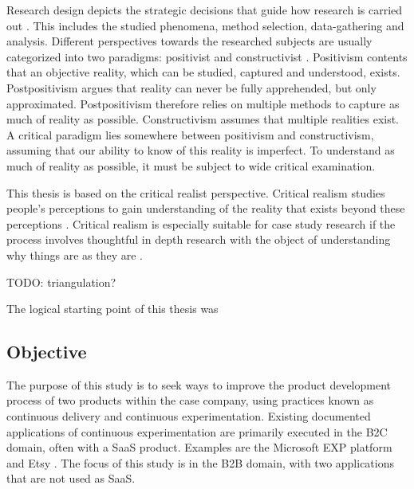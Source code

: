 \documentclass[english]{tktltiki2}
\theoremstyle{definition}
\theoremstyle{remark}
\begin{document}
Research design depicts the strategic decisions that guide how research is carried out \cite{denzin2000discipline}. This includes the studied phenomena, method selection, data-gathering and analysis. Different perspectives towards the researched subjects are usually categorized into two paradigms: positivist and constructivist \cite{gephart2004qualitative}. Positivism contents that an objective reality, which can be studied, captured and understood, exists. Postpositivism argues that reality can never be fully apprehended, but only approximated. Postpositivism therefore relies on multiple methods to capture as much of reality as possible. Constructivism assumes that multiple realities exist. A critical paradigm lies somewhere between positivism and constructivism, assuming that our ability to know of this reality is imperfect. To understand as much of reality as possible, it must be subject to wide critical examination. 

This thesis is based on the critical realist perspective. Critical realism studies people's perceptions to gain understanding of the reality that exists beyond these perceptions \cite{healy2000comprehensive}. Critical realism is especially suitable for case study research if the process involves thoughtful in depth research with the object of understanding why things are as they are \cite{easton2010critical}. 

TODO: triangulation? 

The logical starting point of this thesis was 

\subsection{Objective} %
The purpose of this study is to seek ways to improve the product development process of two products within the case company, using practices known as continuous delivery and continuous experimentation. Existing documented applications of continuous experimentation are primarily executed in the B2C domain, often with a SaaS product. Examples are the Microsoft EXP platform \cite{ep} and Etsy \cite{}. The focus of this study is in the B2B domain, with two applications that are not used as SaaS. 
\end{document}
